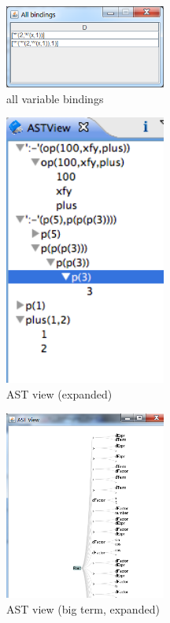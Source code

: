 \begin{figure}
\centering
  \includegraphics[width=200px]{images/plugin8.png}
  \caption{all variable bindings}\label{fig:plugin8}
\end{figure}

\begin{figure}
\centering
  \includegraphics[width=200px]{images/plugin9.png}
  \caption{AST view (expanded)}\label{fig:plugin9}
\end{figure}

\begin{figure}
\centering
  \includegraphics[width=200px]{images/plugin10.png}
  \caption{AST view (big term, expanded)}\label{fig:plugin10}
\end{figure}

